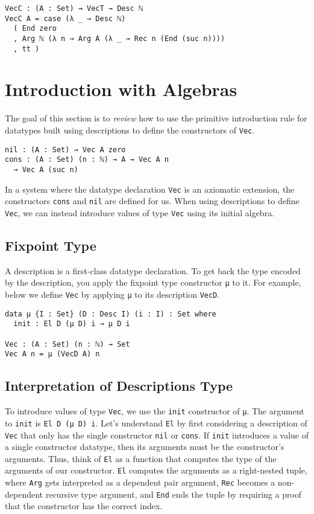 \documentclass[nonatbib]{sigplanconf}
\begin{document}
\begin{verbatim}
VecC : (A : Set) → VecT → Desc ℕ
VecC A = case (λ _ → Desc ℕ)
  ( End zero
  , Arg ℕ (λ n → Arg A (λ _ → Rec n (End (suc n))))
  , tt )
\end{verbatim}

\section{Introduction with Algebras}
\label{sec:init}

The goal of this section is to {\it review} how to use the primitive
introduction rule for datatypes built using descriptions to define the
constructors of {\tt Vec}.

\begin{verbatim}
nil : (A : Set) → Vec A zero
cons : (A : Set) (n : ℕ) → A → Vec A n
  → Vec A (suc n)
\end{verbatim}

In a system where the datatype declaration {\tt Vec} is an axiomatic
extension, the constructors {\tt cons} and {\tt nil} are defined for
us. When using descriptions to define {\tt Vec}, we can instead
introduce values of type {\tt Vec} using its initial algebra.

\subsection{Fixpoint Type}

A description is a first-class datatype declaration. To get back the
type encoded by the description, you apply the fixpoint type
constructor {\tt μ} to it. For example, below we define {\tt Vec} by
applying {\tt μ} to its description {\tt VecD}.

\begin{verbatim}
data μ {I : Set} (D : Desc I) (i : I) : Set where
  init : El D (μ D) i → μ D i

Vec : (A : Set) (n : ℕ) → Set
Vec A n = μ (VecD A) n
\end{verbatim}

\subsection{Interpretation of Descriptions Type}
\label{sec:init:el}

To introduce values of type {\tt Vec}, we use the
{\tt init} constructor of {\tt μ}. The argument to {\tt init} is
{\tt El D (μ D) i}. Let's understand {\tt El} by first considering a
description of {\tt Vec} that only has the single constructor
{\tt nil} or {\tt cons}. If {\tt init} introduces
a value of a single constructor datatype, then its arguments must be
the constructor's arguments. Thus, think of
{\tt El} as a function that computes the type of the arguments of our
constructor. {\tt El} computes the arguments as a right-nested tuple,
where {\tt Arg} gets interpreted as a dependent pair argument,
{\tt Rec} becomes a non-dependent recursive type argument, and
{\tt End} ends the tuple by requiring a proof that the constructor has
the correct index.
\end{document}
